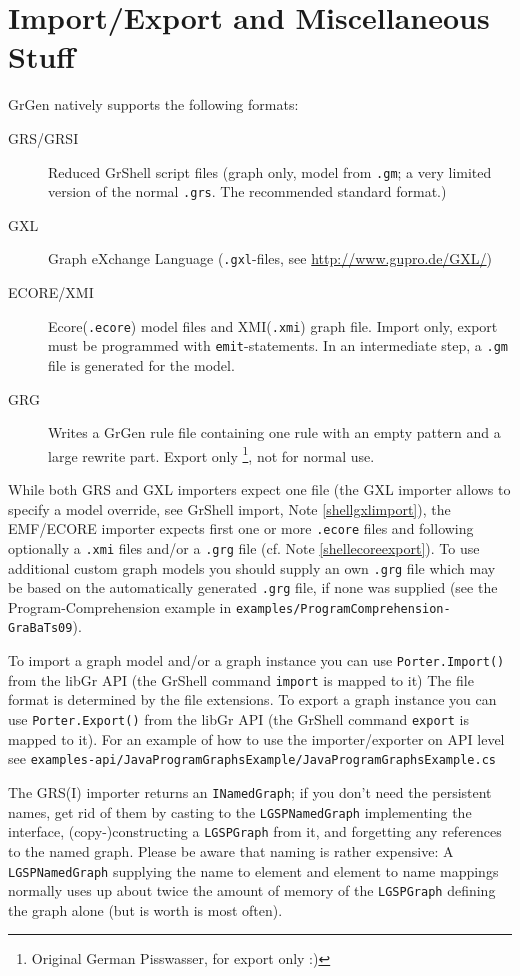 \section{Import/Export and Miscellaneous Stuff}\label{sub:imexport}

GrGen natively supports the following formats:
\begin{description}
  \item[GRS/GRSI] Reduced GrShell script files (graph only, model from \texttt{.gm}; a very limited version of the normal \texttt{.grs}. The recommended standard format.)
  \item[GXL] Graph eXchange Language (\texttt{.gxl}-files, see \url{http://www.gupro.de/GXL/})
  \item[ECORE/XMI] Ecore(\texttt{.ecore}) model files and XMI(\texttt{.xmi}) graph file. Import only, export must be programmed with \texttt{emit}-statements. In an intermediate step, a \texttt{.gm} file is generated for the model.
    \item[GRG] Writes a GrGen rule file containing one rule with an empty pattern and a large rewrite part. Export only \footnote{Original German Pisswasser, for export only :)}, not for normal use.
\end{description}

While both GRS and GXL importers expect one file
(the GXL importer allows to specify a model override, see GrShell import, Note \ref{shellgxlimport}),
the EMF/ECORE importer expects first one or more \texttt{.ecore} files
and following optionally a \texttt{.xmi} files and/or a \texttt{.grg} file (cf. Note \ref{shellecoreexport}). 
To use additional custom graph models you should supply an own \texttt{.grg}
file which may be based on the automatically generated \texttt{.grg} file, if none was
supplied (see the Program-Comprehension example in \texttt{examples/ProgramComprehension-GraBaTs09}).

To import a graph model and/or a graph instance you can use \texttt{Porter.Import()} from the libGr API (the GrShell command \texttt{import} is mapped to it)
The file format is determined by the file extensions.
To export a graph instance you can use \texttt{Porter.Export()} from the libGr API (the GrShell command \texttt{export} is mapped to it).
For an example of how to use the importer/exporter on API level see \texttt{examples-api/JavaProgramGraphsExample/JavaProgramGraphs\-Example.cs}

The GRS(I) importer returns an \texttt{INamedGraph};
if you don't need the persistent names, get rid of them by casting to the \texttt{LGSPNamedGraph} implementing the interface, (copy-)constructing a \texttt{LGSPGraph} from it, and forgetting any references to the named graph.
Please be aware that naming is rather expensive:
A \texttt{LGSPNamedGraph} supplying the name to element and element to name mappings normally uses up about twice the amount of memory of the \texttt{LGSPGraph} defining the graph alone (but is worth is most often).


